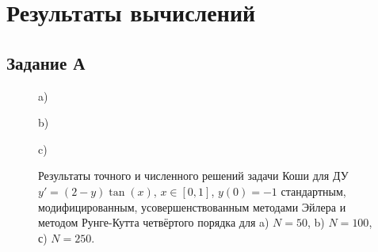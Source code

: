 \documentclass[
11pt,
master, %
subf, %
href, %
colorlinks=true, %
times, %
]{disser}
\begin{document}
\section{Результаты вычислений}
\subsection{Задание А}
\begin{figure}[h]
\begin{minipage}[h]{1\linewidth}
 a) \\
\end{minipage}
\vfill
\begin{minipage}[h]{1\linewidth}
 b) \\
\end{minipage}
\vfill
\begin{minipage}[h]{1\linewidth}
 c) \\
\end{minipage}
\caption{Результаты точного и численного решений задачи Коши для ДУ $y' = (2-y) \tan(x)$, $x\in [0,1]$, $y(0) = -1$ стандартным, модифицированным, усовершенствованным методами Эйлера и методом Рунге-Кутта четвёртого порядка для a) $N = 50$, b) $N = 100$, с) $N = 250$.}
\label{ris:1}
\end{figure}
\end{document}
